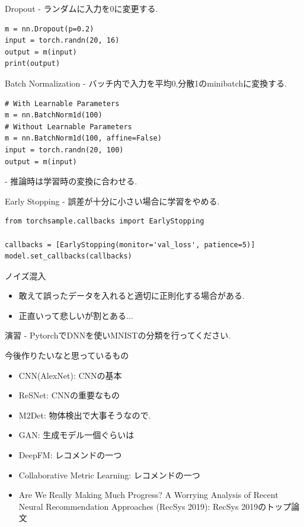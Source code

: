 \begin{frame}[fragile]{Dropout}
- ランダムに入力を0に変更する.

\begin{verbatim}
m = nn.Dropout(p=0.2)
input = torch.randn(20, 16)
output = m(input)
print(output)
\end{verbatim}

\end{frame}


\begin{frame}[fragile]{Batch Normalization}
- バッチ内で入力を平均0,分散1のminibatchに変換する.
\begin{verbatim}
# With Learnable Parameters
m = nn.BatchNorm1d(100)
# Without Learnable Parameters
m = nn.BatchNorm1d(100, affine=False)
input = torch.randn(20, 100)
output = m(input)
\end{verbatim}
- 推論時は学習時の変換に合わせる.

\end{frame}
\begin{frame}[fragile]{Early Stopping}
- 誤差が十分に小さい場合に学習をやめる.
\begin{verbatim}
from torchsample.callbacks import EarlyStopping

callbacks = [EarlyStopping(monitor='val_loss', patience=5)]
model.set_callbacks(callbacks)
\end{verbatim}
\end{frame}
\begin{frame}[fragile]{ノイズ混入}
\begin{itemize}
\item 敢えて誤ったデータを入れると適切に正則化する場合がある.
\item 正直いって悲しいが割とある...
\end{itemize}
\end{frame}


\begin{frame}[fragile]{演習}
- PytorchでDNNを使いMNISTの分類を行ってください.

\end{frame}
\begin{frame}[fragile]{今後作りたいなと思っているもの}
\begin{itemize}
\item CNN(AlexNet): CNNの基本
\item ReSNet: CNNの重要なもの
\item M2Det: 物体検出で大事そうなので.
\item GAN: 生成モデル一個ぐらいは
\item DeepFM: レコメンドの一つ
\item Collaborative Metric Learning: レコメンドの一つ
\item Are We Really Making Much Progress? A Worrying Analysis of Recent Neural Recommendation Approaches (RecSys 2019): RecSys 2019のトップ論文
\end{itemize}
\end{frame}

